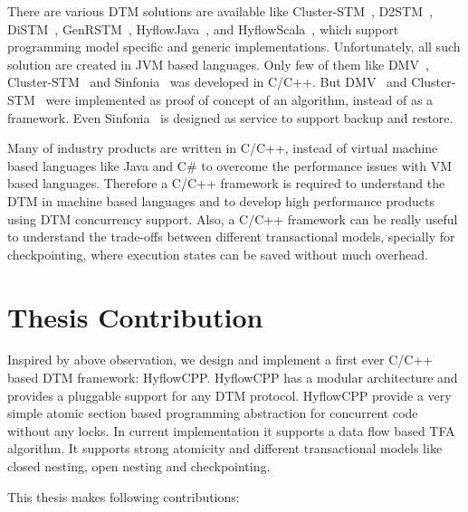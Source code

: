 \documentclass[12pt,english]{report}
\begin{document}
There are various DTM solutions are available like Cluster-STM~\cite{Bocchino:2008:STM:1345206.1345242}, D2STM~\cite{D2STM:5368778}, DiSTM~\cite{Kotselidis08distm:a}, GenRSTM~\cite{GenRSTM:6038614}, HyflowJava~\cite{Saad:2011:HHP:1996130.1996167}, and HyflowScala~\cite{turcuhyflow2}, which support programming model specific and generic implementations. Unfortunately, all such solution are created in JVM based languages. Only few of them like DMV~\cite{Manassiev:2006:EDV:1122971.1123002}, Cluster-STM~\cite{Bocchino:2008:STM:1345206.1345242} and Sinfonia~\cite{Aguilera:2009:SNP:1629087.1629088}  was developed in C/C++. But DMV~\cite{Manassiev:2006:EDV:1122971.1123002} and Cluster-STM~\cite{Bocchino:2008:STM:1345206.1345242}  were implemented as proof of concept of an algorithm, instead of as a framework. Even Sinfonia~\cite{Aguilera:2009:SNP:1629087.1629088} is designed as service to support backup and restore.

Many of industry products are written in C/C++, instead of virtual machine based languages like Java and C\# to overcome the performance issues with VM based languages. Therefore a C/C++ framework is required to understand the DTM in machine based languages and to develop high performance products using DTM concurrency support. Also, a C/C++ framework can be really useful to understand the trade-offs between different transactional models, specially for checkpointing, where execution states can be saved without much overhead. 

\section{Thesis Contribution}

Inspired by above observation, we design and implement a first ever C/C++ based DTM framework: HyflowCPP. HyflowCPP has a modular architecture and provides a pluggable support for any DTM protocol. HyflowCPP provide a very simple atomic section based programming abstraction for concurrent code without any locks. In current implementation it supports a data flow based TFA algorithm. It supports strong atomicity and different transactional models like closed nesting, open nesting and checkpointing.  

This thesis makes following contributions:
\end{document}
